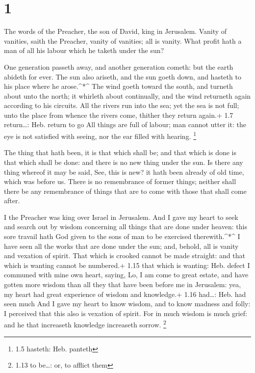 \hypertarget{section}{%
\section{1}\label{section}}

 The words of the Preacher, the son of David, king in
Jerusalem.  Vanity of vanities, saith the Preacher, vanity
of vanities; all is vanity.  What profit hath a man of all
his labour which he taketh under the sun?

 One generation passeth away, and another generation cometh:
but the earth abideth for ever.  The sun also ariseth, and
the sun goeth down, and hasteth to his place where he arose.\^{}*\^{}
 The wind goeth toward the south, and turneth about unto the
north; it whirleth about continually, and the wind returneth again
according to his circuits.  All the rivers run into the sea;
yet the sea is not full; unto the place from whence the rivers come,
thither they return again.+ 1.7 return\ldots: Heb. return to go
 All things are full of labour; man cannot utter it: the eye
is not satisfied with seeing, nor the ear filled with hearing.
\footnote{1.5 hasteth: Heb. panteth}

 The thing that hath been, it is that which shall be; and
that which is done is that which shall be done: and there is no new
thing under the sun.  Is there any thing whereof it may be
said, See, this is new? it hath been already of old time, which was
before us.  There is no remembrance of former things;
neither shall there be any remembrance of things that are to come with
those that shall come after.

 I the Preacher was king over Israel in Jerusalem.
 And I gave my heart to seek and search out by wisdom
concerning all things that are done under heaven: this sore travail hath
God given to the sons of man to be exercised therewith.\^{}*\^{}
 I have seen all the works that are done under the sun;
and, behold, all is vanity and vexation of spirit.  That
which is crooked cannot be made straight: and that which is wanting
cannot be numbered.+ 1.15 that which is wanting: Heb. defect
 I communed with mine own heart, saying, Lo, I am come to
great estate, and have gotten more wisdom than all they that have been
before me in Jerusalem: yea, my heart had great experience of wisdom and
knowledge.+ 1.16 had\ldots: Heb. had seen much  And I gave
my heart to know wisdom, and to know madness and folly: I perceived that
this also is vexation of spirit.  For in much wisdom is
much grief: and he that increaseth knowledge increaseth sorrow.
\footnote{1.13 to be\ldots: or, to afflict them}

